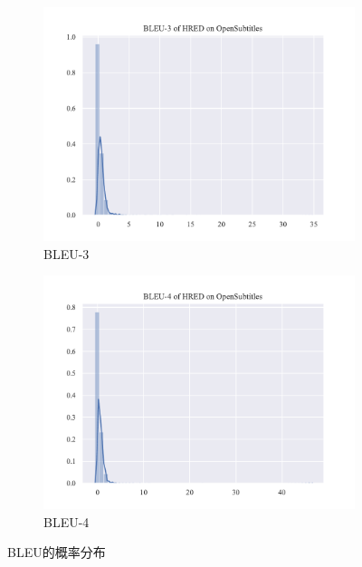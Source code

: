 \begin{figure}[H]
\begin{subfigure}{0.4\linewidth}
        \includegraphics[width=\linewidth]{figure/distplot/opensub/hred/bleu_3/plot.pdf}
        \caption{BLEU-3}
    \end{subfigure}%
    \begin{subfigure}{0.4\linewidth}
        \centering
        \includegraphics[width=\linewidth]{figure/distplot/opensub/hred/bleu_4/plot.pdf}
        \caption{BLEU-4}
    \end{subfigure}
    \centering
    \caption{BLEU的概率分布}
    \label{fig:BLEU_dist}
\end{figure}
